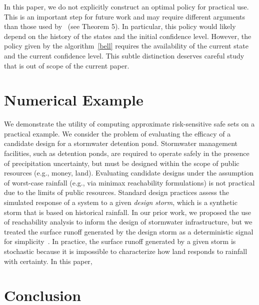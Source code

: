 \documentclass[letterpaper, 10 pt, conference]{ieeeconf}  %
\begin{document}
In this paper, we do not explicitly construct an optimal policy for practical use.
This is an important step for future work and may require different arguments 
than those used by~\cite{chow2015risk} (see Theorem 5). In particular, this policy would likely depend 
on the history of the states and the initial confidence level. However, the policy given by the algorithm~\eqref{bell}
requires the availability of the current state and the current confidence level. 
This subtle distinction deserves careful study that is out of scope of the current paper.

\section{Numerical Example}\label{ex}
We demonstrate the utility of computing approximate risk-sensitive safe sets on a practical example.
We consider the problem of evaluating the efficacy of a candidate design for a stormwater detention pond.
Stormwater management facilities, such as detention ponds, are required to operate safely 
in the presence of precipitation uncertainty, but must be designed within the scope of public resources (e.g., money, land). 
Evaluating candidate designs under the assumption of worst-case rainfall (e.g., via minimax reachability formulations) 
is not practical due to the limits of public resources.
Standard design practices assess the simulated response of a system to a given \textit{design storm},
which is a synthetic storm that is based on historical rainfall. 
In our prior work, we proposed the use of reachability analysis to inform the design of stormwater infrastructure, but we 
treated the surface runoff generated by the design storm as a deterministic signal for simplicity~\cite{sustech}.
In practice, the surface runoff generated by a given storm is stochastic because it is impossible to characterize how land 
responds to rainfall with certainty. In this paper, 



\section{Conclusion}\label{conc}
\end{document}
